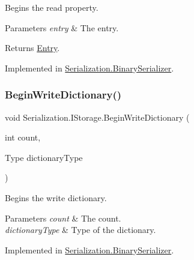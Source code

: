 Begins the read property. 


\begin{DoxyParams}{Parameters}
{\em entry} & The entry.\\
\hline
\end{DoxyParams}
\begin{DoxyReturn}{Returns}
\hyperlink{class_serialization_1_1_entry}{Entry}.
\end{DoxyReturn}


Implemented in \hyperlink{class_serialization_1_1_binary_serializer_a0c77f70b9259bc13d96eafe34b092f3b}{Serialization.\+Binary\+Serializer}.

\mbox{\label{interface_serialization_1_1_i_storage_ac8185d715cc5318790a408427e5bc113}} 
\subsubsection{\texorpdfstring{Begin\+Write\+Dictionary()}{BeginWriteDictionary()}}
{\footnotesize\ttfamily void Serialization.\+I\+Storage.\+Begin\+Write\+Dictionary (\begin{DoxyParamCaption}\item[{int}]{count,  }\item[{Type}]{dictionary\+Type }\end{DoxyParamCaption})}



Begins the write dictionary. 


\begin{DoxyParams}{Parameters}
{\em count} & The count.\\
\hline
{\em dictionary\+Type} & Type of the dictionary.\\
\hline
\end{DoxyParams}


Implemented in \hyperlink{class_serialization_1_1_binary_serializer_afd9aec76b7b20ab88a9e3caca7470c8b}{Serialization.\+Binary\+Serializer}.

\mbox{\label{interface_serialization_1_1_i_storage_a73c60fce612a22b4832223b245688384}} 
